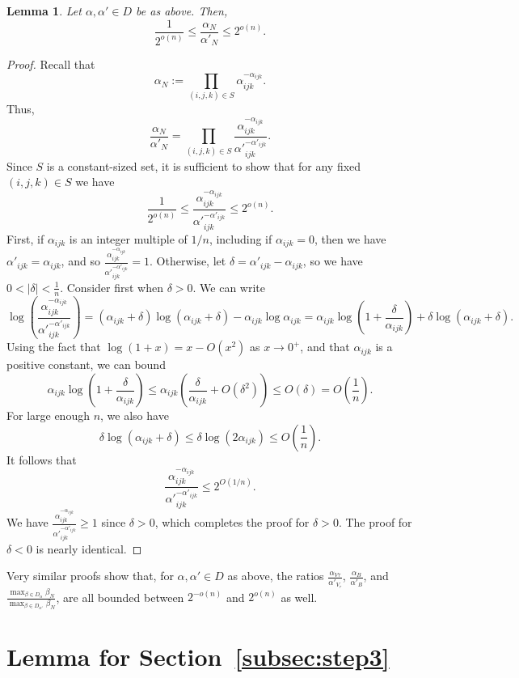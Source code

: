 \PassOptionsToPackage{shortlabels}{enumitem}\documentclass[10pt,a4paper]{article}
\newtheorem{lemma}{Lemma}[section]
\begin{document}
\begin{lemma}
Let $\alpha,\alpha' \in D$ be as above. Then, $$\frac{1}{2^{o(n)}} \leq \frac{\alpha_N}{\alpha'_N} \leq 2^{o(n)}.$$
\end{lemma}

\begin{proof}
Recall that $$\alpha_N := \prod_{(i,j,k) \in S} \alpha_{ijk}^{-\alpha_{ijk}}.$$ Thus, $$\frac{\alpha_N}{\alpha'_N} = \prod_{(i,j,k) \in S} \frac{\alpha_{ijk}^{-\alpha_{ijk}}}{{\alpha'}_{ijk}^{-{\alpha'}_{ijk}}}.$$
Since $S$ is a constant-sized set, it is sufficient to show that for any fixed $(i,j,k) \in S$ we have $$\frac{1}{2^{o(n)}} \leq \frac{\alpha_{ijk}^{-\alpha_{ijk}}}{{\alpha'}_{ijk}^{-\alpha'_{ijk}}}\leq 2^{o(n)}.$$
First, if $\alpha_{ijk}$ is an integer multiple of $1/n$, including if $\alpha_{ijk}=0$, then we have $\alpha'_{ijk} = \alpha_{ijk}$, and so $\frac{\alpha_{ijk}^{-\alpha_{ijk}}}{{\alpha'}_{ijk}^{-{\alpha'}_{ijk}}} = 1$.
Otherwise, let $\delta = \alpha'_{ijk} - \alpha_{ijk}$, so we have $0 < |\delta| < \frac{1}{n}$. Consider first when $\delta>0$. We can write 
$$\log\left( \frac{\alpha_{ijk}^{-\alpha_{ijk}}}{{\alpha'}_{ijk}^{-\alpha'_{ijk}}} \right) = (\alpha_{ijk} + \delta) \log(\alpha_{ijk}+\delta) - \alpha_{ijk} \log \alpha_{ijk} = \alpha_{ijk} \log\left(1 + \frac{\delta}{\alpha_{ijk}}\right) + \delta \log(\alpha_{ijk} + \delta).$$
Using the fact that $\log(1+x) = x - O(x^2)$ as $x \to 0^+$, and that $\alpha_{ijk}$ is a positive constant, we can bound $$\alpha_{ijk} \log\left(1 + \frac{\delta}{\alpha_{ijk}}\right) \leq \alpha_{ijk} \left( \frac{\delta}{\alpha_{ijk}} + O(\delta^2) \right) \leq O(\delta) = O\left(\frac{1}{n}\right).$$
For large enough $n$, we also have
$$\delta \log(\alpha_{ijk} + \delta) \leq \delta \log(2\alpha_{ijk}) \leq O\left(\frac{1}{n}\right).$$
It follows that $$\frac{\alpha_{ijk}^{-\alpha_{ijk}}}{{\alpha'}_{ijk}^{-\alpha'_{ijk}}} \leq 2^{O(1/n)}.$$ We have $\frac{\alpha_{ijk}^{-\alpha_{ijk}}}{{\alpha'}_{ijk}^{-{\alpha'}_{ijk}}} \geq 1$ since $\delta>0$, which completes the proof for $\delta>0$. The proof for $\delta<0$ is nearly identical. 
\end{proof}

Very similar proofs show that, for $\alpha,\alpha' \in D$ as above, the ratios $\frac{\alpha_{V{\tau}}}{\alpha'_{V_\tau}}$, $\frac{\alpha_B}{\alpha'_B}$, and $\frac{\max_{\beta\in D_\alpha} \beta_N}{\max_{\beta\in D_{\alpha'}} \beta_N}$, are all bounded between $2^{-o(n)}$ and $2^{o(n)}$ as well.

\section{Lemma for Section~\ref{subsec:step3}}\label{app:powermean}
\end{document}
